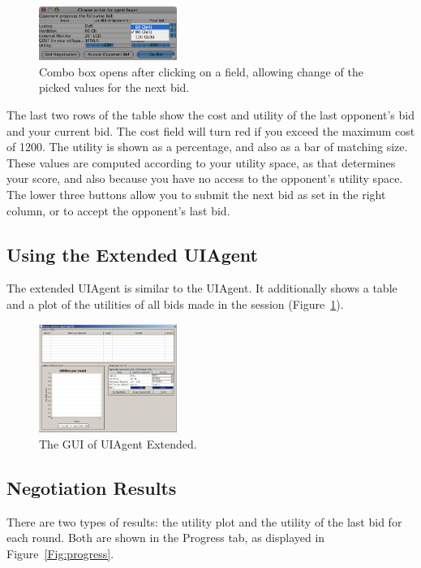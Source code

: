 \documentclass[]{article}
\begin{document}
{	\begin{figure}[htb]
		\centering
		\includegraphics[width=0.4\textwidth]{media/image13.png}
	\caption{Combo box opens after clicking on a field, allowing change of the picked values for the next bid.}
	\end{figure}

	The last two rows of the table show the cost and utility of the last opponent's bid and your current bid. The cost field will turn red if you exceed the maximum cost of 1200. The utility is shown as a percentage, and also as a bar of matching size. These values are computed according to your utility space, as that determines your score, and also because you have no access to the opponent's utility space. The lower three buttons allow you to submit the next bid as set in the right column, or to accept the opponent's last bid.

	\subsection{Using the Extended UIAgent}

	The extended UIAgent is similar to the UIAgent. It additionally shows a table and a plot of the utilities of all bids made in the session (Figure~\ref{Fig:uiagent extended gui}).

	\begin{figure}[htb]
		\centering
		\includegraphics[width=0.4\textwidth]{media/image14.png}
	\caption{The GUI of UIAgent Extended.}\label{Fig:uiagent extended gui}
	\end{figure}
}
\subsection{Negotiation Results}

There are two types of results: the utility plot and the utility of the last bid for each round. Both are shown in the Progress tab, as displayed in Figure~\ref{Fig:progress}.
\end{document}
